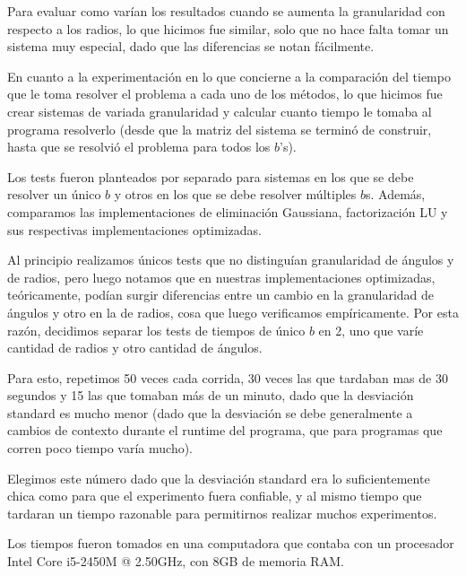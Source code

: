 Para evaluar como varían los resultados cuando se aumenta la granularidad con respecto a los radios, lo que hicimos fue similar, solo que no hace falta tomar un sistema muy especial, dado que las diferencias se notan fácilmente.

En cuanto a la experimentación en lo que concierne a la comparación del tiempo que le toma resolver el problema a cada uno de los métodos, lo que hicimos fue crear sistemas de variada granularidad y calcular cuanto tiempo le tomaba al programa resolverlo (desde que la matriz del sistema se terminó de construir, hasta que se resolvió el problema para todos los $b$'s).

Los tests fueron planteados por separado para sistemas en los que se debe resolver un único $b$ y otros en los que se debe resolver múltiples $b$s. Además, comparamos las implementaciones de eliminación Gaussiana, factorización LU y sus respectivas implementaciones optimizadas.

Al principio realizamos únicos tests que no distinguían granularidad de ángulos y de radios, pero luego notamos que en nuestras implementaciones optimizadas, teóricamente, podían surgir diferencias entre un cambio en la granularidad de ángulos y otro en la de radios, cosa que luego verificamos empíricamente. Por esta razón, decidimos separar los tests de tiempos de único $b$ en 2, uno que varíe cantidad de radios y otro cantidad de ángulos.


Para esto, repetimos 50 veces cada corrida, 30 veces las que tardaban mas de 30 segundos y 15 las que tomaban más de un minuto, dado que la desviación standard es mucho menor (dado que la desviación se debe generalmente a cambios de contexto durante el runtime del programa, que para programas que corren poco tiempo varía mucho).

Elegimos este número dado que la desviación standard era lo suficientemente chica como para que el experimento fuera confiable, y al mismo tiempo que tardaran un tiempo razonable para permitirnos realizar muchos experimentos.

Los tiempos fueron tomados en una computadora que contaba con un procesador Intel Core i5-2450M @ 2.50GHz, con 8GB de memoria RAM.